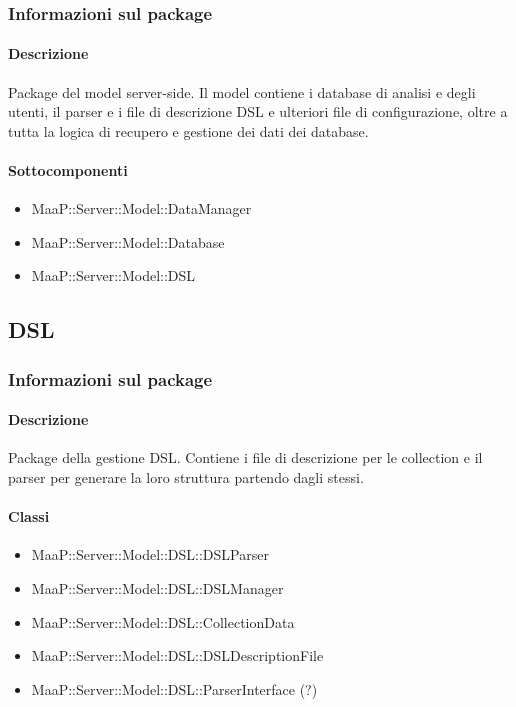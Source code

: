 \subsubsection{Informazioni sul package}
\paragraph{Descrizione}
Package del model server-side. Il model contiene i database di analisi e degli utenti, il parser e i file di descrizione DSL e ulteriori file di configurazione, oltre a tutta la logica di recupero e gestione dei dati dei database. 

\paragraph{Sottocomponenti}
\begin{itemize}
\item MaaP::Server::Model::DataManager
\item MaaP::Server::Model::Database
\item MaaP::Server::Model::DSL
\end{itemize}

\subsection{DSL}
\subsubsection{Informazioni sul package}
\paragraph{Descrizione}
Package della gestione DSL. Contiene i file di descrizione per le collection e il parser per generare la loro struttura partendo dagli stessi.

\paragraph{Classi}
\begin{itemize}
\item MaaP::Server::Model::DSL::DSLParser
\item MaaP::Server::Model::DSL::DSLManager
\item MaaP::Server::Model::DSL::CollectionData
\item MaaP::Server::Model::DSL::DSLDescriptionFile
\item MaaP::Server::Model::DSL::ParserInterface (?)
\end{itemize}

